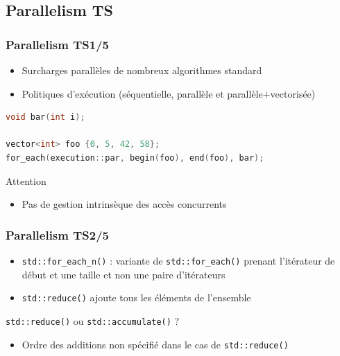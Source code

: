 \documentclass[C++.tex]{subfiles}
\begin{document}
\subsection*{Parallelism TS}
\begin{frame}[fragile]
	\frametitle{Parallelism TS\titlehfill{}1/5}
	\begin{itemize}
		\item Surcharges \og parallèles\fg{} de nombreux algorithmes standard
		\item Politiques d'exécution (séquentielle, parallèle et parallèle+vectorisée)
	\end{itemize}

	\begin{lstlisting}[language=C++]
void bar(int i);

vector<int> foo {0, 5, 42, 58};
for_each(execution::par, begin(foo), end(foo), bar);\end{lstlisting}

	\begin{alertblock}{Attention}
		\begin{itemize}
			\item Pas de gestion intrinsèque des accès concurrents
		\end{itemize}
	\end{alertblock}
\end{frame}

\begin{frame}[fragile]
	\frametitle{Parallelism TS\titlehfill{}2/5}
	\begin{itemize}
		\item \lstinline|std::for_each_n()| : variante de \lstinline|std::for_each()| prenant l'itérateur de début et une taille et non une paire d'itérateurs


		\item \lstinline|std::reduce()| \og ajoute\fg{} tous les éléments de l'ensemble
	\end{itemize}

	\begin{block}{\lstinline|std::reduce()| ou \lstinline|std::accumulate()| ?}
		\begin{itemize}
			\item Ordre des \og additions\fg{} non spécifié dans le cas de \lstinline|std::reduce()|
		\end{itemize}

	\end{block}
\end{frame}
\end{document}
